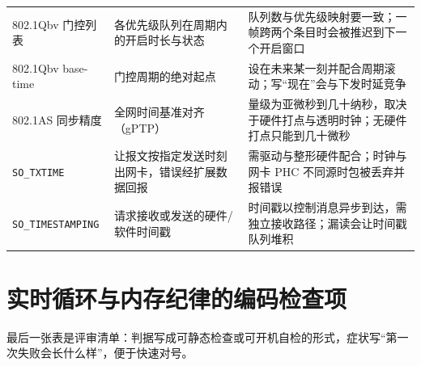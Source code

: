 \documentclass[12pt,a4paper,fontset=fandol]{ctexbook}
\newcommand{\Tp}[1]{\texttt{#1}}
\begin{document}
\begin{longtable}{>{\raggedright\arraybackslash\footnotesize}p{} >{\raggedright\arraybackslash\footnotesize}p{} >{\raggedright\arraybackslash\footnotesize}p{}}
802.1Qbv 门控列表 & 各优先级队列在周期内的开启时长与状态 & 队列数与优先级映射要一致；一帧跨两个条目时会被推迟到下一个开启窗口 \\
802.1Qbv base-time & 门控周期的绝对起点 & 设在未来某一刻并配合周期滚动；写``现在''会与下发时延竞争 \\
802.1AS 同步精度 & 全网时间基准对齐（gPTP） & 量级为亚微秒到几十纳秒，取决于硬件打点与透明时钟；无硬件打点只能到几十微秒 \\
\Tp{SO\_TXTIME} & 让报文按指定发送时刻出网卡，错误经扩展数据回报 & 需驱动与整形硬件配合；时钟与网卡 PHC 不同源时包被丢弃并报错误 \\
\Tp{SO\_TIMESTAMPING} & 请求接收或发送的硬件/软件时间戳 & 时间戳以控制消息异步到达，需独立接收路径；漏读会让时间戳队列堆积 \\
\end{longtable}

\section{实时循环与内存纪律的编码检查项}

最后一张表是评审清单：判据写成可静态检查或可开机自检的形式，症状写``第一次失败会长什么样''，便于快速对号。
\end{document}
